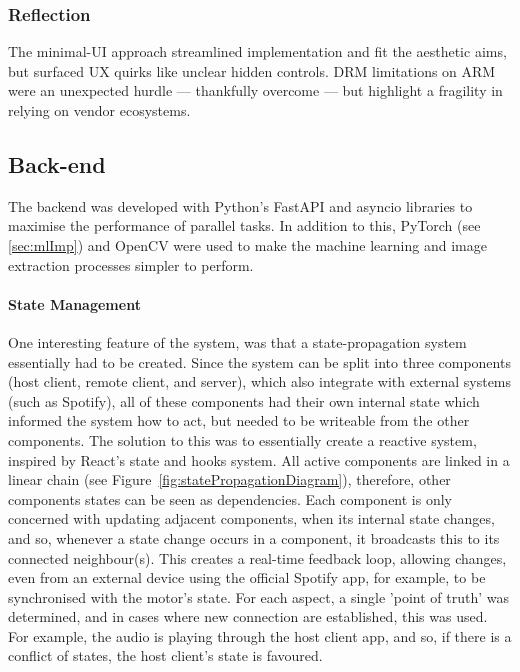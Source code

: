            \subsubsection*{Reflection}
                The minimal-UI approach streamlined implementation and fit the aesthetic aims, but surfaced UX quirks like unclear hidden controls. DRM limitations on ARM were an unexpected hurdle — thankfully overcome — but highlight a fragility in relying on vendor ecosystems.
    
        \subsection{Back-end} %
    
            The backend was developed with Python's FastAPI and asyncio libraries to maximise the performance of parallel tasks. In addition to this, PyTorch (see \ref{sec:mlImp}) and OpenCV were used to make the machine learning and image extraction processes simpler to perform.
    
            \paragraph{State Management}
            One interesting feature of the system, was that a state-propagation system essentially had to be created. Since the system can be split into three components (host client, remote client, and server), which also integrate with external systems (such as Spotify), all of these components had their own internal state which informed the system how to act, but needed to be writeable from the other components. The solution to this was to essentially create a reactive system, inspired by React's state and hooks system. All active components are linked in a linear chain (see Figure~\ref{fig:statePropagationDiagram}), therefore, other components states can be seen as dependencies. Each component is only concerned with updating adjacent components, when its internal state changes, and so, whenever a state change occurs in a component, it broadcasts this to its connected neighbour(s). This creates a real-time feedback loop, allowing changes, even from an external device using the official Spotify app, for example, to be synchronised with the motor's state. For each aspect, a single 'point of truth' was determined, and in cases where new connection are established, this was used. For example, the audio is playing through the host client app, and so, if there is a conflict of states, the host client's state is favoured.
            
